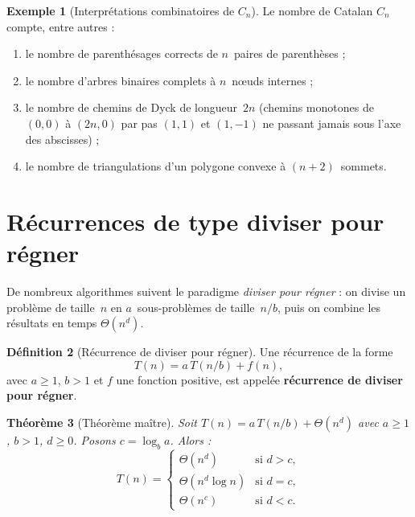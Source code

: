 \documentclass[12pt,a4paper,openany]{book}
\theoremstyle{definition}
\newtheorem{definition}{Définition}[chapter]
\newtheorem{exemple}[definition]{Exemple}
\theoremstyle{plain}
\newtheorem{theoreme}[definition]{Théorème}
\theoremstyle{remark}
\begin{document}
\begin{exemple}[Interprétations combinatoires de $C_n$]
\label{ex:catalan-interp}
Le nombre de Catalan $C_n$ compte, entre autres :
\begin{enumerate}[label=(\roman*)]
  \item le nombre de parenthésages corrects de $n$~paires de parenthèses ;
  \item le nombre d'arbres binaires complets à $n$~nœuds internes ;
  \item le nombre de chemins de Dyck de longueur~$2n$ (chemins monotones de
    $(0,0)$ à $(2n,0)$ par pas $(1,1)$ et $(1,-1)$ ne passant jamais sous
    l'axe des abscisses) ;
  \item le nombre de triangulations d'un polygone convexe à $(n+2)$~sommets.
\end{enumerate}
\end{exemple}

\section{Récurrences de type diviser pour régner}
\label{sec:diviser-regner}

De nombreux algorithmes suivent le paradigme \emph{diviser pour régner} : on divise
un problème de taille~$n$ en $a$~sous-problèmes de taille~$n/b$, puis on combine
les résultats en temps $\Theta(n^d)$.

\begin{definition}[Récurrence de diviser pour régner]
\label{def:rec-diviser}
Une récurrence de la forme
\begin{equation}
\label{eq:rec-diviser}
  T(n) = a\, T(n/b) + f(n),
\end{equation}
avec $a \geq 1$, $b > 1$ et $f$ une fonction positive, est appelée
\textbf{récurrence de diviser pour régner}.
\end{definition}

\begin{theoreme}[Théorème maître]
\label{thm:maitre}
Soit $T(n) = a\, T(n/b) + \Theta(n^d)$ avec $a \geq 1$, $b > 1$, $d \geq 0$.
Posons $c = \log_b a$. Alors :
\[
  T(n) = \begin{cases}
    \Theta(n^d) & \text{si } d > c, \\[4pt]
    \Theta(n^d \log n) & \text{si } d = c, \\[4pt]
    \Theta(n^c) & \text{si } d < c.
  \end{cases}
\]
\end{theoreme}
\end{document}
